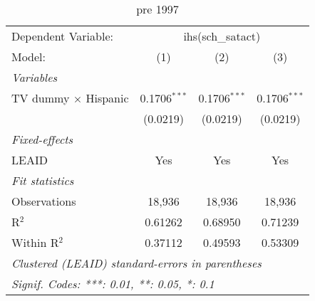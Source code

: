 \begin{table}[htbp]
\centering
\caption{pre 1997}
\begin{tabular}{lccc}
\tabularnewline\midrule\midrule
Dependent Variable:&\multicolumn{3}{c}{ihs(sch\_satact)}\\
Model:&(1) & (2) & (3)\\
\midrule \emph{Variables}&   &   &  \\
TV dummy $\times$ Hispanic & 0.1706$^{***}$ & 0.1706$^{***}$ & 0.1706$^{***}$\\
  &(0.0219) & (0.0219) & (0.0219)\\
\midrule \emph{Fixed-effects}&   &   &  \\
LEAID & Yes & Yes & Yes\\
\midrule \emph{Fit statistics}&  & & \\
Observations & 18,936&18,936&18,936\\
R$^2$ & 0.61262&0.68950&0.71239\\
Within R$^2$ & 0.37112&0.49593&0.53309\\
\midrule\midrule\multicolumn{4}{l}{\emph{Clustered (LEAID) standard-errors in parentheses}}\\
\multicolumn{4}{l}{\emph{Signif. Codes: ***: 0.01, **: 0.05, *: 0.1}}\\
\end{tabular}
\end{table}

